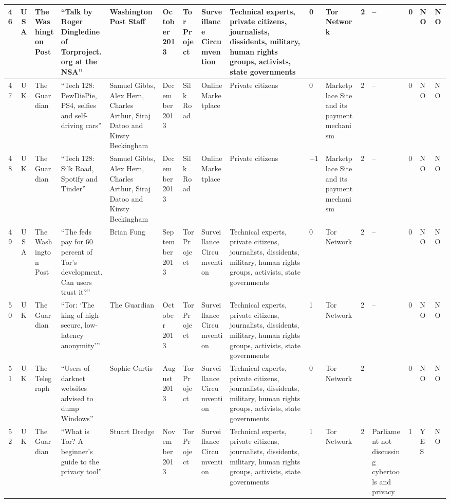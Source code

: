 \begin{landscape}
{\begin{longtable}{|c|c|p{1.2cm}|p{2.5cm}|p{1.4cm}|p{1.2cm}|p{1.4cm}|p{1.2cm}|p{1.8cm}|p{0.4cm}|p{1.8cm}|p{0.4cm}|p{1.5cm}|p{0.4cm}|p{0.6cm}|p{0.6cm}|}
\hline
46 & USA & The Washington Post & ``Talk by Roger Dingledine of Torproject.org at the NSA'' & Washington Post Staff & October 2013 &Tor Project & Surveillance Circumvention & Technical experts, private citizens, journalists, dissidents, military, human rights groups, activists, state governments & 0 & Tor Network & 2 & -- & 0 & NO & NO \\
\hline
47 & UK & The Guardian & ``Tech 128: PewDiePie, PS4, selfies and self-driving cars'' & Samuel Gibbs, Alex Hern, Charles Arthur, Siraj Datoo and Kirsty Beckingham & December 2013 &Silk Road & Online Marketplace & Private citizens & 0 & Marketplace Site and its payment mechanism & 2 & -- & 0 & NO & NO \\
\hline
48 & UK & The Guardian & ``Tech 128: Silk Road, Spotify and Tinder'' & Samuel Gibbs, Alex Hern, Charles Arthur, Siraj Datoo and Kirsty Beckingham & December 2013 &Silk Road & Online Marketplace & Private citizens & $-1$ & Marketplace Site and its payment mechanism & 2 & -- & 0 & NO & NO \\
\hline
49 & USA & The Washington Post & ``The feds pay for 60 percent of Tor's development. Can users trust it?'' & Brian Fung & September 2013 &Tor Project & Surveillance Circumvention & Technical experts, private citizens, journalists, dissidents, military, human rights groups, activists, state governments & 0 & Tor Network & 2 & -- & 0 & NO & NO \\
\hline
50 & UK & The Guardian & ``Tor: `The king of high-secure, low-latency anonymity''' & The Guardian & October 2013 &Tor Project & Surveillance Circumvention & Technical experts, private citizens, journalists, dissidents, military, human rights groups, activists, state governments & 1 & Tor Network & 2 & -- & 0 & NO & NO \\
\hline
51 & UK & The Telegraph & ``Users of darknet websites advised to dump Windows'' & Sophie Curtis & August 2013 &Tor Project & Surveillance Circumvention & Technical experts, private citizens, journalists, dissidents, military, human rights groups, activists, state governments & 0 & Tor Network & 2 & -- & 0 & NO & NO \\
\hline
52 & UK & The Guardian & ``What is Tor? A beginner's guide to the privacy tool'' & Stuart Dredge & November 2013 &Tor Project & Surveillance Circumvention & Technical experts, private citizens, journalists, dissidents, military, human rights groups, activists, state governments & 1 & Tor Network & 2 & Parliament not discussing cybertools and privacy & 1 & YES & NO \\

\end{longtable}}
\end{landscape}

